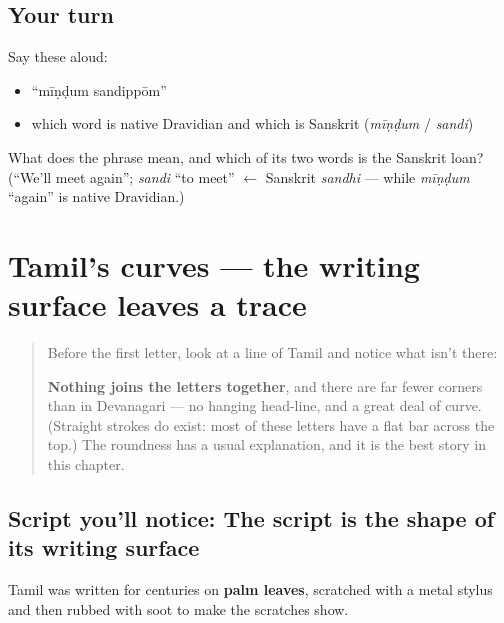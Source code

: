 \subsection*{Your turn}
Say these aloud:

\begin{itemize}
\raggedright
  \item \textquotedblleft{}mīṇḍum sandippōm\textquotedblright{}
  \item which word is native Dravidian and which is Sanskrit (\emph{mīṇḍum} / \emph{sandi})
\end{itemize}

\begin{tcolorbox}[breakable,colback=teal!4,colframe=teal!35!black,title={Before you move on}]
What does the phrase mean, and which of its two words is the Sanskrit loan? (\textquotedblleft{}We'll meet again\textquotedblright{}; \emph{sandi} \textquotedblleft{}to meet\textquotedblright{} $\leftarrow$ Sanskrit \emph{sandhi} — while \emph{mīṇḍum} \textquotedblleft{}again\textquotedblright{} is native Dravidian.)
\end{tcolorbox}
\section[\texorpdfstring{\ta{தமிழ்} \ta{எழுத்து} (tamiḻ eḻuttu)}{தமிழ் எழுத்து (tamiḻ eḻuttu)}]{Tamil's curves — the writing surface leaves a trace}

\label{lesson:TA-W01-curves-va-ka}



\begin{quote}
Before the first letter, look at a line of Tamil and notice what isn't there:

\begin{quote}
\end{quote}

\textbf{Nothing joins the letters together}, and there are far fewer corners than in Devanagari — no hanging head-line, and a great deal of curve. (Straight strokes do exist: most of these letters have a flat bar across the top.) The roundness has a usual explanation, and it is the best story in this chapter.
\end{quote}

\subsection*{Script you'll notice: The script is the shape of its writing surface}
Tamil was written for centuries on \textbf{palm leaves}, scratched with a metal stylus and then rubbed with soot to make the scratches show.

